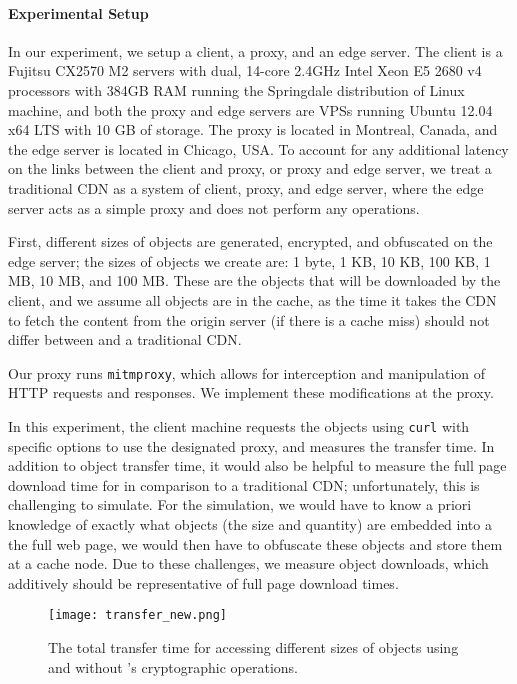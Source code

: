 \paragraph{Experimental Setup}
In our experiment, we setup a client, a proxy, and an edge server.  The client is a  Fujitsu CX2570 M2 servers with dual, 
14-core 2.4GHz Intel Xeon E5 2680 v4 processors with 384GB RAM running the Springdale distribution of Linux machine, 
and both the proxy and edge servers are VPSs running Ubuntu 12.04 x64 LTS with 10 GB of storage. The proxy is located in 
Montreal, Canada, and the edge server is located in Chicago, USA.  To account for any additional latency on the links between 
the client and proxy, or proxy and edge server, we treat a traditional CDN as a system of client, proxy, and edge server, where 
the edge server acts as a simple proxy and does not perform any operations.  

First, different sizes of objects are generated, encrypted, and obfuscated on the edge server; the sizes of objects we create are: 
1 byte, 1 KB, 10 KB, 100 KB, 1 MB, 10 MB, and 100 MB.  These are the objects that will be downloaded by the client, and we 
assume all objects are in the cache, as the time it takes the CDN to fetch the content from the origin server (if there is a cache 
miss) should not differ between \system{} and a traditional CDN. 

Our proxy runs {\tt mitmproxy}, which allows for interception and manipulation of HTTP requests and responses.  We implement 
these modifications at the proxy.  

In this experiment, the client machine requests the objects using {\tt curl} with specific options to use the designated proxy, 
and measures the transfer time.  In addition to object transfer time, it would also be helpful to measure the full page 
download time for \system{} in comparison to a traditional CDN; unfortunately, this is challenging to simulate.  For the 
simulation, we would have to know a priori knowledge of exactly what objects (the size and quantity) are embedded into a the 
full web page, we would then have to obfuscate these objects and store them at a cache node.  Due to these challenges, we measure 
object downloads, which additively should be representative of full page download times. \\

\begin{figure}[t]
\centering
\texttt{[image: transfer\_new.png]}
\caption{The total transfer time for accessing different sizes of objects using \system{} and without \system{}'s cryptographic operations.}
\label{fig:transfer}
\end{figure}

